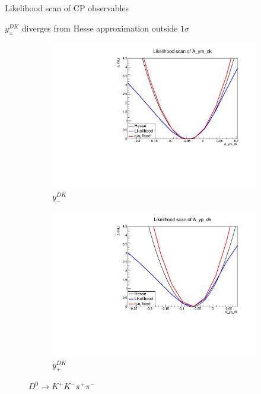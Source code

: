 \documentclass{beamer}
\begin{document}
\begin{frame}{Likelihood scan of CP observables}
  \begin{center}
    $y_\pm^{DK}$ diverges from Hesse approximation outside $1\sigma$
  \end{center}
  \begin{figure}
    \centering
    \begin{subfigure}{0.5\textwidth}
      \centering
      \includegraphics[width=1.0\textwidth]{Plots/A_ym_dk_likelihood_scan_KKpipi.pdf}
      \vspace{-0.3cm}
      \caption*{$y_-^{DK}$}
    \end{subfigure}%
    \begin{subfigure}{0.5\textwidth}
      \centering
      \includegraphics[width=1.0\textwidth]{Plots/A_yp_dk_likelihood_scan_KKpipi.pdf}
      \vspace{-0.3cm}
      \caption*{$y_+^{DK}$}
    \end{subfigure}
    \caption*{$D^0\to K^+K^-\pi^+\pi^-$}
  \end{figure}
\end{frame}
\end{document}
